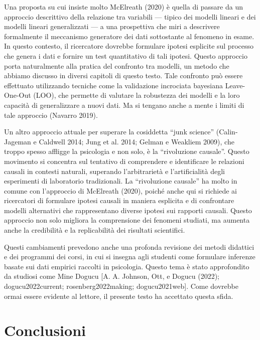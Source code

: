 \documentclass[
  letterpaper,
  krantz2]{{[}./krantz{]}}
\begin{document}
Una proposta su cui insiste molto McElreath (2020) è quella di passare
da un approccio descrittivo della relazione tra variabili --- tipico dei
modelli lineari e dei modelli lineari generalizzati --- a una
prospettiva che miri a descrivere formalmente il meccanismo generatore
dei dati sottostante al fenomeno in esame. In questo contesto, il
ricercatore dovrebbe formulare ipotesi esplicite sul processo che genera
i dati e fornire un test quantitativo di tali ipotesi. Questo approccio
porta naturalmente alla pratica del confronto tra modelli, un metodo che
abbiamo discusso in diversi capitoli di questo testo. Tale confronto può
essere effettuato utilizzando tecniche come la validazione incrociata
bayesiana Leave-One-Out (LOO), che permette di valutare la robustezza
dei modelli e la loro capacità di generalizzare a nuovi dati. Ma si
tengano anche a mente i limiti di tale approccio (Navarro 2019).

Un altro approccio attuale per superare la cosiddetta ``junk science''
(Calin-Jageman e Caldwell 2014; Jung et al. 2014; Gelman e Weakliem
2009), che troppo spesso affligge la psicologia e non solo, è la
``rivoluzione causale''. Questo movimento si concentra sul tentativo di
comprendere e identificare le relazioni causali in contesti naturali,
superando l'arbitrarietà e l'artificialità degli esperimenti di
laboratorio tradizionali. La ``rivoluzione causale'' ha molto in comune
con l'approccio di McElreath (2020), poiché anche qui si richiede ai
ricercatori di formulare ipotesi causali in maniera esplicita e di
confrontare modelli alternativi che rappresentano diverse ipotesi sui
rapporti causali. Questo approccio non solo migliora la comprensione dei
fenomeni studiati, ma aumenta anche la credibilità e la replicabilità
dei risultati scientifici.

Questi cambiamenti prevedono anche una profonda revisione dei metodi
didattici e dei programmi dei corsi, in cui si insegna agli studenti
come formulare inferenze basate sui dati empirici raccolti in
psicologia. Questo tema è stato approfondito da studiosi come Mine
Dogucu {[}A. A. Johnson, Ott, e Dogucu (2022); dogucu2022current;
rosenberg2022making; dogucu2021web{]}. Come dovrebbe ormai essere
evidente al lettore, il presente testo ha accettato questa sfida.

\section*{Conclusioni}\label{conclusioni}
\end{document}

